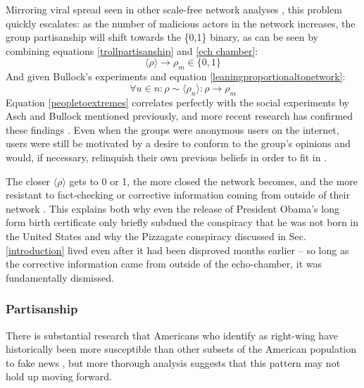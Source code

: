 \documentclass[preprint,review,12pt]{elsarticle}
\begin{document}
Mirroring viral spread seen in other scale-free network analyses \cite{pastor2001epidemic,cohen2003efficient}, this problem quickly escalates: as the number of malicious actors in the network increases, the group partisanship will shift towards the \{0,1\} binary, as can be seen by combining equations \ref{trollpartisanship} and \ref{ech chamber}: 
\begin{equation}
\langle \rho \rangle \rightarrow \rho_m \in \{0,1\}
\end{equation} 
And given Bullock's experiments and equation \ref{leaningproportionaltonetwork}:
\begin{equation}
\label{peopletoextremes}
    \forall u \in n: \rho \sim \langle \rho_n \rangle: \rho \rightarrow \rho_m
\end{equation}
Equation \ref{peopletoextremes} correlates perfectly with the social experiments by Asch and Bullock mentioned previously, and more recent research has confirmed these findings \cite{colliander2019fake,edelson2011following}. Even when the groups were anonymous users on the internet, users were still be motivated by a desire to conform to the group's opinions and would, if necessary, relinquish their own previous beliefs in order to fit in \cite{williams2000cyberostracism,zhu2012switch,tsikerdekis2013effects,breitsohl2015groupthink,winter2015they,hamilton2017s}. 

The closer $\langle \rho \rangle$ gets to 0 or 1, the more closed the network becomes, and the more resistant to fact-checking or corrective information coming from outside of their network \cite{garrett2013undermining,lord1979biased,edwards1996disconfirmation,redlawsk2002hot, taber2006motivated}. This explains both why even the release of President Obama's long form birth certificate only briefly subdued the conspiracy that he was not born in the United States \cite{nyhan2012new} and why the Pizzagate conspiracy discussed in Sec. \ref{introduction} lived even after it had been disproved months earlier -- so long as the corrective information came from outside of the echo-chamber, it was fundamentally dismissed.

\subsubsection{Partisanship} 
\label{Partisanship Section}
There is substantial research that Americans who identify as right-wing have historically been more susceptible than other subsets of the American population to fake news \cite{guess2019less,benkler2018network,grinberg2019fake,allcott2017social,badawy2018analyzing}, but more thorough analysis suggests that this pattern may not hold up moving forward.
\end{document}
